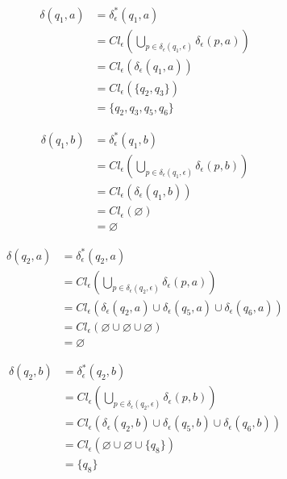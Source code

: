 \documentclass{article}
\begin{document}
\begin{enumerate}
{\begin{enumerate}
{					\begin{align*}
						\delta(q_{1}, a) &= \delta^{*}_{\epsilon}(q_{1}, a) \\
						&= Cl_{\epsilon}(\bigcup_{p \in \delta_{\epsilon}(q_{1}, \epsilon)}
						{\delta_{\epsilon}(p, a)}) \\
						&= Cl_{\epsilon}(\delta_{\epsilon}(q_{1}, a))\\
						&= Cl_{\epsilon}(\{q_{2}, q_{3}\})\\
						&= \{q_{2}, q_{3}, q_{5}, q_{6}\}
					\end{align*}

					\begin{align*}
						\delta(q_{1}, b) &= \delta^{*}_{\epsilon}(q_{1}, b) \\
						&= Cl_{\epsilon}(\bigcup_{p \in \delta_{\epsilon}(q_{1}, \epsilon)}
						{\delta_{\epsilon}(p, b)}) \\
						&= Cl_{\epsilon}(\delta_{\epsilon}(q_{1}, b)) \\
						&= Cl_{\epsilon}(\varnothing) \\
						&= \varnothing
					\end{align*}

					\begin{align*}
						\delta(q_{2}, a) &= \delta^{*}_{\epsilon}(q_{2}, a) \\
						&= Cl_{\epsilon}(\bigcup_{p \in \delta_{\epsilon}(q_{2}, \epsilon)}
						{\delta_{\epsilon}(p, a)}) \\
						&= Cl_{\epsilon}(\delta_{\epsilon}(q_{2}, a) 
						\cup \delta_{\epsilon}(q_{5}, a)
						\cup \delta_{\epsilon}(q_{6}, a))\\
						&= Cl_{\epsilon}(\varnothing \cup \varnothing \cup \varnothing)\\
						&= \varnothing
					\end{align*}

					\begin{align*}
						\delta(q_{2}, b) &= \delta^{*}_{\epsilon}(q_{2}, b) \\
						&= Cl_{\epsilon}(\bigcup_{p \in \delta_{\epsilon}(q_{2}, \epsilon)}
						{\delta_{\epsilon}(p, b)}) \\
						&= Cl_{\epsilon}(\delta_{\epsilon}(q_{2}, b) 
						\cup \delta_{\epsilon}(q_{5}, b)
						\cup \delta_{\epsilon}(q_{6}, b))\\
						&= Cl_{\epsilon}(\varnothing \cup \varnothing \cup \{q_{8}\})\\
						&= \{q_{8}\}
					\end{align*}

}
\end{enumerate}}
\end{enumerate}
\end{document}
